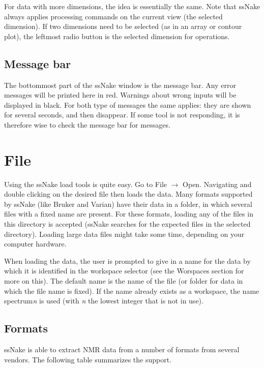 \documentclass[11pt,a4paper]{article}
\begin{document}
For data with more dimensions, the idea is essentially the same. Note that ssNake always applies processing commands on the current view (the selected dimension). If two dimensions need to be selected (as in an array or contour plot), the leftmost radio button is the selected dimension for operations.

\subsection{Message bar}
The bottommost part of the ssNake window is the message bar. Any error messages will be printed here in red. Warnings about wrong inputs will be displayed in black. For both type of messages the same applies: they are shown for several seconds, and then disappear. If some tool is not responding, it is therefore wise to check the message bar for messages.

\section{File}
Using the ssNake load tools is quite easy. Go to File $\rightarrow$ Open. Navigating and double clicking on the desired file then loads the data. Many formats supported by ssNake (like Bruker and Varian) have their data in a folder, in which several files with a fixed name are present. For these formats, loading any of the files in this directory is accepted (ssNake searches for the expected files in the selected directory). Loading large data files might take some time, depending on your computer hardware.

When loading the data, the user is prompted to give in a name for the data by which it is identified in the workspace selector (see the Worspaces section for more on this). The default name is the name of the file (or folder for data in which the file name is fixed). If the name already exists as a workspace, the name spectrum\textit{n} is used (with \textit{n} the lowest integer that is not in use).


\subsection{Formats}
ssNake is able to extract NMR data from a number of formats from several vendors. The following table summarizes the support.
\end{document}
